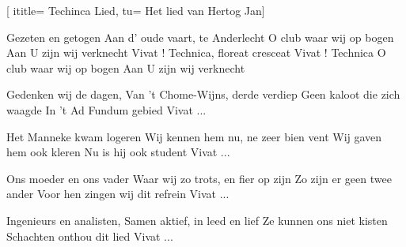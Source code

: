  [
ititle= {Techinca Lied},
tu= {Het lied van Hertog Jan}]


\beginverse
Gezeten en getogen
Aan d' oude vaart, te Anderlecht
O club waar wij op bogen
Aan U zijn wij verknecht
Vivat ! Technica, floreat cresceat
Vivat ! Technica
O club waar wij op bogen
Aan U zijn wij verknecht
\endverse

\beginverse
Gedenken wij de dagen,
Van 't Chome-Wijns, derde verdiep
Geen kaloot die zich waagde
In 't Ad Fundum gebied
Vivat ...
\endverse

\beginverse
Het Manneke kwam logeren
Wij kennen hem nu, ne zeer bien vent
Wij gaven hem ook kleren
Nu is hij ook student
Vivat ...
\endverse

\beginverse
Ons moeder en ons vader
Waar wij zo trots, en fier op zijn
Zo zijn er geen twee ander
Voor hen zingen wij dit refrein
Vivat ...
\endverse

\beginverse
Ingenieurs en analisten,
Samen aktief, in leed en lief
Ze kunnen ons niet kisten
Schachten onthou dit lied
Vivat ...
\endverse

\endsong